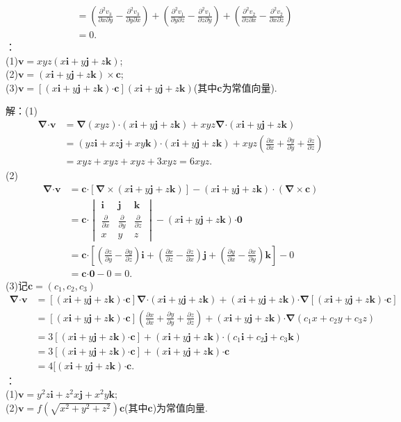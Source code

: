 \documentclass[12pt,UTF8]{ctexart}
\newcommand{\pp}[2]{\frac{\partial #1}{\partial #2}}
\begin{document}
\begin{enumerate}
\[\begin{split}
&=(\frac{\partial^2 v_3}{\partial x\partial y}-\frac{\partial^2 v_3}{\partial y\partial x})+(\frac{\partial^2 v_1}{\partial y\partial  z}-\frac{\partial^2 v_1}{\partial z\partial y})+(\frac{\partial^2 v_2}{\partial z\partial x}-\frac{\partial^2 v_2}{\partial x\partial z})\\
&=0.
\end{split}\]
：\\
(1)$\bm v=xyz(x\bm i+y\bm j+z\bm k)$;\\
(2)$\bm v=(x\bm i+y\bm j+z\bm k)\times\bm c$;\\
(3)$\bm v=[(x\bm i+y\bm j+z\bm k)\bm\cdot\bm c](x\bm i+y\bm j+z\bm k)$(其中$\bm c$为常值向量).

解：(1)\[\begin{split}
\bm\nabla\bm\cdot\bm v&=\bm\nabla(xyz)\bm\cdot(x\bm i+y\bm j+z\bm k)+xyz\bm\nabla\bm\cdot(x\bm i+y\bm j+z\bm k)\\
&=(yz\bm i+xz\bm j+xy\bm k)\bm\cdot(x\bm i+y\bm j+z\bm k)+xyz(\pp xx+\pp yy+\pp zz)\\
&=xyz+xyz+xyz+3xyz=6xyz.
\end{split}\]
(2)\[\begin{split}
\bm\nabla\bm\cdot\bm v&=\bm c\bm\cdot[\bm\nabla\times(x\bm i+y\bm j+z\bm k)]-(x\bm i+y\bm j+z\bm k)\cdot(\bm\nabla\times\bm c)\\
&=\bm c\bm\cdot\begin{vmatrix}
\bm i&\bm j&\bm k\\
\pp{}x&\pp{}y&\pp{}z\\
x&y&z
\end{vmatrix}-(x\bm i+y\bm j+z\bm k)\bm\cdot\bm0\\
&=\bm c\bm\cdot[(\pp zy-\pp yz)\bm i+(\pp xz-\pp zx)\bm j+(\pp yx-\pp xy)\bm k]-0\\
&=\bm c\bm\cdot\bm0-0=0.
\end{split}\]
(3)记$\bm c=(c_1,c_2,c_3)$
\[\begin{split}
\bm\nabla\bm\cdot\bm v&=[(x\bm i+y\bm j+z\bm k)\bm\cdot\bm c]\bm\nabla\bm\cdot(x\bm i+y\bm j+z\bm k)+(x\bm i+y\bm j+z\bm k)\bm\cdot\bm\nabla[(x\bm i+y\bm j+z\bm k)\bm\cdot\bm c]\\
&=[(x\bm i+y\bm j+z\bm k)\bm\cdot\bm c](\pp xx+\pp yy+\pp zz)+(x\bm i+y\bm j+z\bm k)\bm\cdot\bm\nabla(c_1x+c_2y+c_3z)\\
&=3[(x\bm i+y\bm j+z\bm k)\bm\cdot\bm c]+(x\bm i+y\bm j+z\bm k)\bm\cdot(c_1\bm i+c_2\bm j+c_3\bm k)\\
&=3[(x\bm i+y\bm j+z\bm k)\bm\cdot\bm c]+(x\bm i+y\bm j+z\bm k)\bm\cdot\bm c\\
&=4[(x\bm i+y\bm j+z\bm k)\bm\cdot\bm c.
\end{split}\]
：\\
(1)$\bm v=y^2z\bm i+z^2x\bm j+x^2y\bm k$;\\
(2)$\bm v=f(\sqrt{x^2+y^2+z^2})\bm c$(其中$\bm c$)为常值向量.


\end{enumerate}
\end{document}
